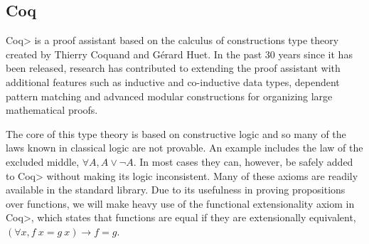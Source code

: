 \subsection{Coq}
\<Coq> is a proof assistant based on the calculus of constructions type theory created by Thierry Coquand and G\'{e}rard Huet\cite{Coquand1988}.
In the past 30 years since it has been released, research has contributed to extending the proof assistant with additional features such as inductive and co-inductive data types\cite{Coquand1990}, dependent pattern matching\cite{Sozeau2010} and advanced modular constructions for organizing large mathematical proofs\cite{Sozeau2008}\cite{Mahboubi2013}.

The core of this type theory is based on constructive logic and so many of the laws known in classical logic are not provable.
An example includes the law of the excluded middle, $\forall A, A \vee \neg A$.
In most cases they can, however, be safely added to \<Coq> without making its logic inconsistent. Many of these axioms are readily available in the standard library.
Due to its usefulness in proving propositions over functions, we will make heavy use of the functional extensionality axiom in \<Coq>, which states that functions are equal if they are extensionally equivalent, $(\forall x, f\ x = g\ x) \to f = g$.



